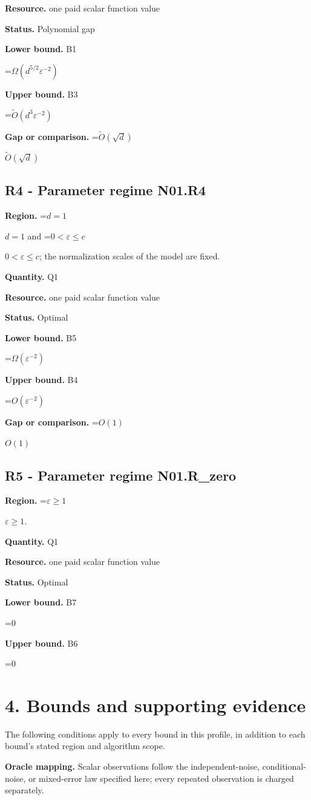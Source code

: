 \documentclass[10pt,a4paper]{article}
\newcommand{\AtlasMath}[1]{\par\begingroup\centering\setbox0=\hbox{$\displaystyle #1$}\ifdim\wd0>1.4\linewidth\typeout{ATLAS WIDE FORMULA: \the\wd0}\fi\ifdim\wd0>\linewidth\resizebox{\linewidth}{!}{\box0}\else\box0\fi\par\endgroup}
\newcommand{\AtlasInlineMath}[1]{\begingroup\setbox0=\hbox{$#1$}\ifdim\wd0>.4\linewidth\endgroup\AtlasMath{#1}\else\endgroup$#1$\fi}
\begin{document}
\textbf{Resource.} one paid scalar function value

\textbf{Status.} Polynomial gap

\textbf{Lower bound.} B1

\AtlasMath{\Omega(d^{5/2}\varepsilon^{-2})}
\textbf{Upper bound.} B3

\AtlasMath{\widetilde{O}(d^3\varepsilon^{-2})}
\textbf{Gap or comparison.} \AtlasInlineMath{\widetilde{O}(\sqrt d)}

\subsection{R4 - Parameter regime N01.R4}
\textbf{Region.} \AtlasInlineMath{d=1} and \AtlasInlineMath{0<\varepsilon\le c}; the normalization scales of the model are fixed.

\textbf{Quantity.} Q1

\textbf{Resource.} one paid scalar function value

\textbf{Status.} Optimal

\textbf{Lower bound.} B5

\AtlasMath{\Omega(\varepsilon^{-2})}
\textbf{Upper bound.} B4

\AtlasMath{O(\varepsilon^{-2})}
\textbf{Gap or comparison.} \AtlasInlineMath{O(1)}

\subsection{R5 - Parameter regime N01.R\_zero}
\textbf{Region.} \AtlasInlineMath{\varepsilon\ge1}.

\textbf{Quantity.} Q1

\textbf{Resource.} one paid scalar function value

\textbf{Status.} Optimal

\textbf{Lower bound.} B7

\AtlasMath{0}
\textbf{Upper bound.} B6

\AtlasMath{0}
\section{4. Bounds and supporting evidence}
The following conditions apply to every bound in this profile, in addition to each bound's stated region and algorithm scope.

\textbf{Oracle mapping.} Scalar observations follow the independent-noise, conditional-noise, or mixed-error law specified here; every repeated observation is charged separately.
\end{document}
